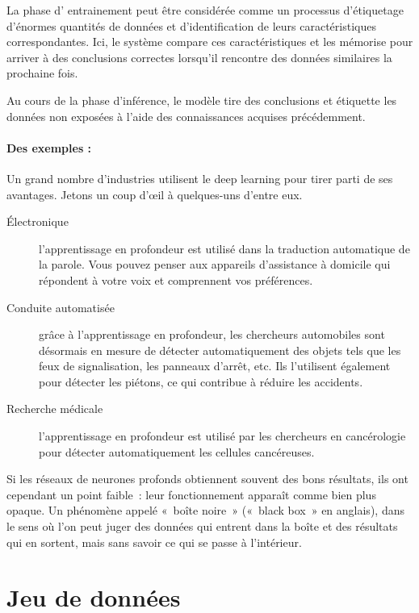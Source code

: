 \documentclass[oneside,13pt,a4paper]{report}
\begin{document}
La phase d' entrainement peut être considérée comme un processus d'étiquetage d'énormes quantités de données et d'identification de leurs caractéristiques correspondantes. Ici, le système compare ces caractéristiques et les mémorise pour arriver à des conclusions correctes lorsqu'il rencontre des données similaires la prochaine fois.

Au cours de la phase d'inférence, le modèle tire des conclusions et étiquette les données non exposées à l'aide des connaissances acquises précédemment.

\paragraph{Des exemples : }

Un grand nombre d'industries utilisent le deep learning pour tirer parti de ses avantages. Jetons un coup d'œil à quelques-uns d'entre eux.

\begin{description}
	\item[Électronique] l'apprentissage en profondeur est utilisé dans la traduction automatique de la parole. Vous pouvez penser aux appareils d'assistance à domicile qui répondent à votre voix et comprennent vos préférences.
	\item[Conduite automatisée] grâce à l'apprentissage en profondeur, les chercheurs automobiles sont désormais en mesure de détecter automatiquement des objets tels que les feux de signalisation, les panneaux d'arrêt, etc. Ils l'utilisent également pour détecter les piétons, ce qui contribue à réduire les accidents.
	\item[Recherche médicale] l'apprentissage en profondeur est utilisé par les chercheurs en cancérologie pour détecter automatiquement les cellules cancéreuses.
\end{description}

Si les réseaux de neurones profonds obtiennent souvent des bons résultats, ils ont cependant un point faible : leur fonctionnement apparaît comme bien plus opaque. Un phénomène appelé « boîte noire » (« black box » en anglais), dans le sens où l'on peut juger des données qui entrent dans la boîte et des résultats qui en sortent, mais sans savoir ce qui se passe à l'intérieur.

\section{Jeu de données}
\end{document}
